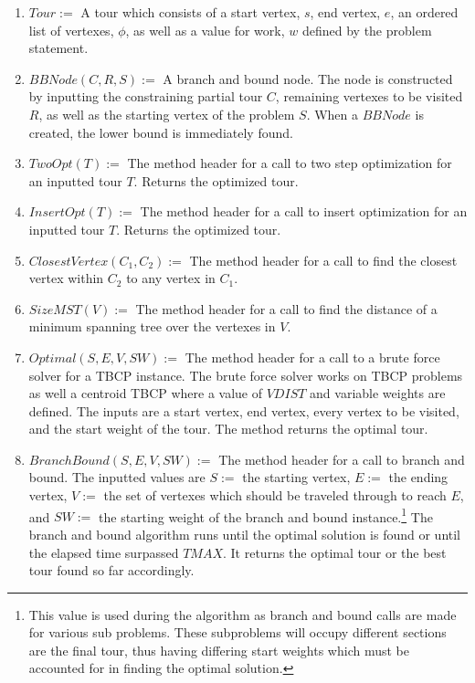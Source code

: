 \documentclass[sigconf, anonymous, pdftex]{acmart}
\begin{document}
\begin{enumerate}
    \item $Tour :=$ A tour which consists of a start vertex, $s$, end vertex, $e$, an ordered list of vertexes, $\phi$, as well as a value for work, $w$ defined by the problem statement.
    
     \item $BBNode(C, R, S) :=$ A branch and bound node. The node is constructed by inputting the constraining partial tour $C$, remaining vertexes to be visited $R$, as well as the starting vertex of the problem $S$. When a $BBNode$ is created, the lower bound is immediately found.
    
    \item $TwoOpt(T) :=$ The method header for a call to two step optimization for an inputted tour $T$. Returns the optimized tour.
    
    \item $InsertOpt(T) :=$ The method header for a call to insert optimization for an inputted tour $T$. Returns the optimized tour.
    
    \item $ClosestVertex(C_1, C_2) :=$ The method header for a call to find the closest vertex within $C_2$ to any vertex in $C_1$.
    
    \item $SizeMST(V) :=$ The method header for a call to find the distance of a minimum spanning tree over the vertexes in $V$.
    
    \item $Optimal(S, E, V, SW) :=$ The method header for a call to a brute force solver for a TBCP instance. The brute force solver works on TBCP problems as well a centroid TBCP where a value of $VDIST$ and variable weights are defined. The inputs are a start vertex, end vertex, every vertex to be visited, and the start weight of the tour. The method returns the optimal tour.
    
    \item $BranchBound(S, E, V, SW) :=$ The method header for a call to branch and bound. The inputted values are $S :=$ the starting vertex, $E :=$ the ending vertex, $V :=$ the set of vertexes which should be traveled through to reach $E$, and $SW :=$ the starting weight of the branch and bound instance.\footnote{This value is used during the algorithm as branch and bound calls are made for various sub problems. These subproblems will occupy different sections are the final tour, thus having differing start weights which must be accounted for in finding the optimal solution.} The branch and bound algorithm runs until the optimal solution is found or until the elapsed time surpassed $TMAX$. It returns the optimal tour or the best tour found so far accordingly.
    

\end{enumerate}
\end{document}
